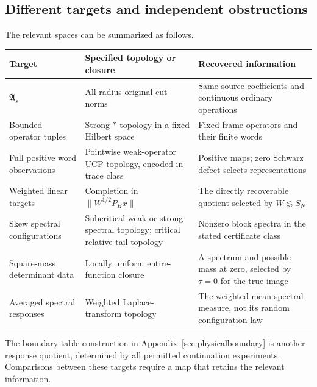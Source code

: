 \documentclass[11pt,a4paper]{amsart}
\numberwithin{equation}{section}
\theoremstyle{definition}
\theoremstyle{remark}
\newcommand{\Alg}{\mathfrak A}
\begin{document}
\subsection{Different targets and independent obstructions}
The relevant spaces can be summarized as follows.
\begin{center}\small
\begin{tabular}{@{}>{\raggedright\arraybackslash}p{.20\linewidth}>{\raggedright\arraybackslash}p{.34\linewidth}>{\raggedright\arraybackslash}p{.40\linewidth}@{}}\toprule
Target & Specified topology or closure & Recovered information\\\midrule
$\Alg_s$ & All-radius original cut norms & Same-source coefficients and continuous ordinary operations\\[3pt]
Bounded operator tuples & Strong-$*$ topology in a fixed Hilbert space & Fixed-frame operators and their finite words\\[3pt]
Full positive word observations & Pointwise weak-operator UCP topology, encoded in trace class & Positive maps; zero Schwarz defect selects representations\\[3pt]
Weighted linear targets & Completion in $\|W^{1/2}P_Hx\|$ & The directly recoverable quotient selected by $W\lesssim S_N$\\[3pt]
Skew spectral configurations & Subcritical weak or strong spectral topology; critical relative-tail topology & Nonzero block spectra in the stated certificate class\\[3pt]
Square-mass determinant data & Locally uniform entire-function closure & A spectrum and possible mass at zero, selected by $\tau=0$ for the true image\\[3pt]
Averaged spectral responses & Weighted Laplace-transform topology & The weighted mean spectral measure, not its random configuration law\\\bottomrule
\end{tabular}
\end{center}
The boundary-table construction in Appendix~\ref{sec:physicalboundary} is another response quotient, determined by all permitted continuation experiments. Comparisons between these targets require a map that retains the relevant information.
\end{document}
